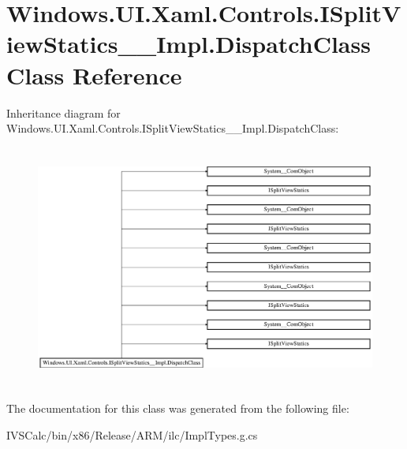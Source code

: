\hypertarget{class_windows_1_1_u_i_1_1_xaml_1_1_controls_1_1_i_split_view_statics_____impl_1_1_dispatch_class}{}\section{Windows.\+U\+I.\+Xaml.\+Controls.\+I\+Split\+View\+Statics\+\_\+\+\_\+\+Impl.\+Dispatch\+Class Class Reference}
\label{class_windows_1_1_u_i_1_1_xaml_1_1_controls_1_1_i_split_view_statics_____impl_1_1_dispatch_class}
Inheritance diagram for Windows.\+U\+I.\+Xaml.\+Controls.\+I\+Split\+View\+Statics\+\_\+\+\_\+\+Impl.\+Dispatch\+Class\+:\begin{figure}[H]
\begin{center}
\leavevmode
\includegraphics[height=8.020833cm]{class_windows_1_1_u_i_1_1_xaml_1_1_controls_1_1_i_split_view_statics_____impl_1_1_dispatch_class}
\end{center}
\end{figure}


The documentation for this class was generated from the following file\+:\begin{DoxyCompactItemize}
\item 
I\+V\+S\+Calc/bin/x86/\+Release/\+A\+R\+M/ilc/Impl\+Types.\+g.\+cs\end{DoxyCompactItemize}
